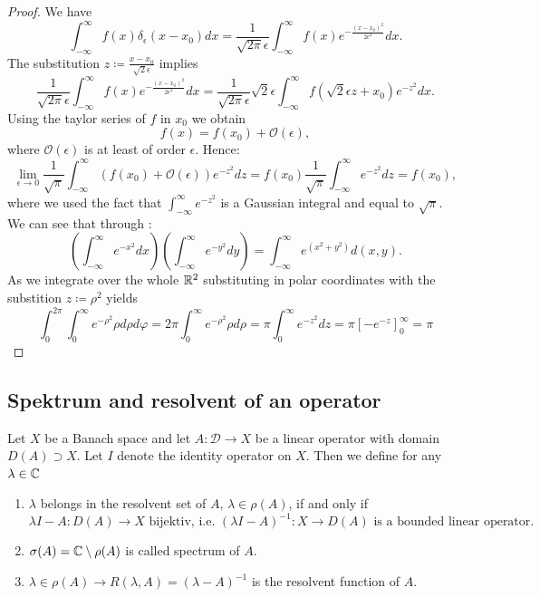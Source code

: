 \begin{proof}
	We have
	\[ \int_{-\infty}^{\infty} f(x) \delta_{\epsilon}(x-x_{0}) dx = \frac{1}{\sqrt{2\pi} \epsilon} \int_{-\infty}^{\infty} f(x) e^{-\frac{(x - x_{0})^{2}}{2 \epsilon^{2}}} dx. \] 
	The substitution $z \coloneqq \frac{x - x_{0}}{\sqrt{2} \epsilon}$ implies 
	\[ \frac{1}{\sqrt{2\pi} \epsilon} \int_{-\infty}^{\infty} f(x) e^{-\frac{(x - x_{0})^{2}}{2 \epsilon^{2}}} dx = \frac{1}{\sqrt{2\pi} \epsilon} \sqrt{2} \epsilon \int_{-\infty}^{\infty} f(\sqrt{2} \epsilon z + x_{0}) e^{-z^{2}} dx. \]
	Using the taylor series of $f$ in $x_{0}$ we obtain
	\[ f(x) = f(x_{0}) + \mathcal{O}(\epsilon), \]
	where $\mathcal{O}(\epsilon)$ is at least of order $\epsilon$. Hence:
	\[ \lim_{\epsilon \rightarrow 0} \frac{1}{\sqrt{\pi}} \int_{-\infty}^{\infty} (f(x_{0}) + \mathcal{O}(\epsilon)) e^{-z^{2}} dz = f(x_{0}) \frac{1}{\sqrt{\pi}} \int_{-\infty}^{\infty} e^{-z^{2}} dz = f(x_{0}), \]
	where we used the fact that $\int_{-\infty}^{\infty} e^{-z^{2}}$ is a Gaussian integral and equal to $\sqrt{\pi}$. We can see that through :
	\[ \left( \int_{-\infty}^{\infty} e^{-x^{2}} dx \right) \left( \int_{-\infty}^{\infty} e^{-y^{2}} dy \right) = \int_{-\infty}^{\infty} e^{(x^{2} + y^{2})} d(x, y). \] 
	As we integrate over the whole $\mathbb{R}^{2}$ substituting in polar coordinates with the substition $z \coloneqq \rho^{2}$ yields
	\[ \int_{0}^{2 \pi} \int_{0}^{\infty} e^{-\rho^{2}} \rho d\rho d\varphi = 2 \pi \int_{0}^{\infty} e^{-\rho^{2}} \rho d\rho = \pi \int_{0}^{\infty} e^{-z^{2}} dz = \pi \left[ -e^{-z} \right]_{0}^{\infty} = \pi \]
\end{proof} 


\subsection*{Spektrum and resolvent of an operator}

Let $X$ be a Banach space and let $A \colon \mathcal{D} \rightarrow X$ be a  linear operator with domain $D(A) \supset X$. Let $I$ denote the identity operator on $X$. Then we define for any $\lambda \in \mathbb{C}$
	\begin{enumerate}[label=\alph*\upshape)]
		\item $\lambda$ belongs in the resolvent set of $A$, $\lambda \in \rho(A)$, if and only if
			\[ \lambda I - A \colon D(A) \rightarrow X \text{ bijektiv, i.e. } (\lambda I - A)^{-1} \colon X \rightarrow D(A) \text{ is a bounded linear operator.} \]
		\item $\sigma(A) = \mathbb{C} \setminus \rho(A)$ is called spectrum of $A$.
		\item $\lambda \in \rho(A) \rightarrow R(\lambda, A) = (\lambda - A)^{-1}$ is the resolvent function of $A$.
	\end{enumerate}	
	
